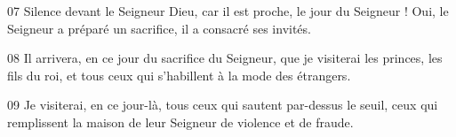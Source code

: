 
07 Silence devant le Seigneur Dieu, car il est proche, le jour du Seigneur ! Oui, le Seigneur a préparé un sacrifice, il a consacré ses invités.

08 Il arrivera, en ce jour du sacrifice du Seigneur, que je visiterai les princes, les fils du roi, et tous ceux qui s’habillent à la mode des étrangers.

09 Je visiterai, en ce jour-là, tous ceux qui sautent par-dessus le seuil, ceux qui remplissent la maison de leur Seigneur de violence et de fraude.